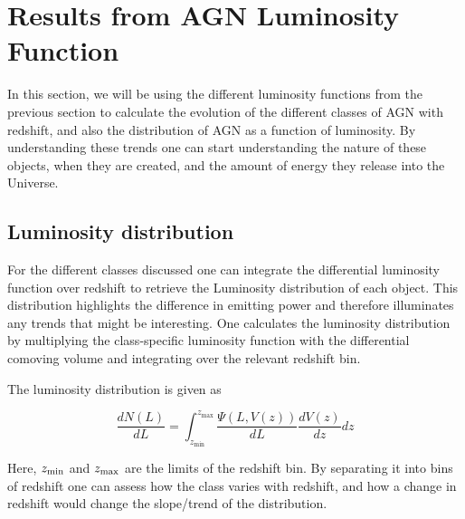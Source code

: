 \section{Results from AGN Luminosity Function}
In this section, we will be using the different luminosity functions from the previous section to calculate the evolution of the different classes of AGN with redshift, and also the distribution of AGN as a function of luminosity. 
By understanding these trends one can start understanding the nature of these objects, when they are created, and the amount of energy they release into the Universe. 



 


\subsection{Luminosity distribution}
 
For the different classes discussed one can integrate the differential luminosity function over redshift to retrieve the Luminosity distribution of each 
object. This distribution highlights the difference in emitting power and therefore illuminates any trends that might be interesting. 
One calculates the luminosity distribution by multiplying the class-specific luminosity
function with the differential comoving volume and integrating over the relevant redshift bin. 

The luminosity distribution is given as


\begin{equation}
    \frac{dN(L)}{dL} = \int_{z_{\text{min}}}^{z_{\text{max}}} \frac{\Psi(L, V(z))}{dL} \frac{dV(z)}{dz} dz
\end{equation}

Here, $z_{\rm min}$ and $z_{\rm max}$ are the limits of the redshift bin. By separating it into
bins of redshift one can assess how the class varies with redshift, and how a change in redshift would change the slope/trend of the distribution.  

